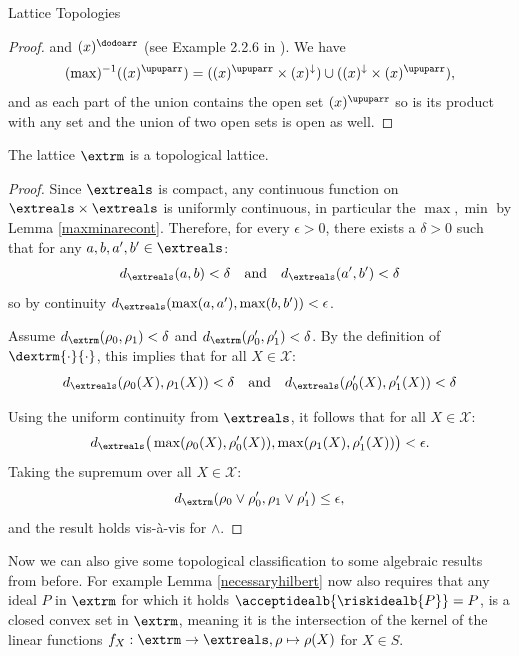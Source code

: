 \begin{subsection}{Lattice Topologies}
\begin{proof}
        and \( (x)^\dodoarr \) (see Example 2.2.6 in \cite{infinitedimanalysis}).
        We have \[ 
            (\max)^{-1} ((x)^\upuparr) = ((x)^\upuparr \times (x)^\downarrow) \cup ((x)^\downarrow \times (x)^\upuparr),
        \]
        and as each part of the union contains the open set \( (x)^\upuparr \) so is its product with any set
        and the union of two open sets is open as well.
    \end{proof}
    \begin{corollary}
        The lattice \( \extrm \) is a topological lattice.
    \end{corollary}
    \begin{proof}
        Since \( \extreals \) is compact, any continuous function on $\extreals \times \extreals$ is 
        uniformly continuous, in particular the \( \max, \min \) by Lemma \ref{maxminarecont}.
        Therefore, for every \(\epsilon > 0\), there exists a \(\delta > 0\) such that for any \(a, b, a', b' \in \extreals\):
        \[
        d_{\extreals}(a, b) < \delta \quad \text{and} \quad d_{\extreals}(a', b') < \delta 
        \]
        so by continuity \( d_{\extreals}(\max(a, a'), \max(b, b')) < \epsilon \).
        \newline

        Assume \(d_{\extrm}(\rho_{0}, \rho_{1}) < \delta\) and \(d_{\extrm}(\rho_0', \rho_1') < \delta\). 
        By the definition of \( \dextrm{\cdot}{\cdot} \), this implies that for all \(X \in \mathcal{X}\):
        \[
            d_{\extreals}(\rho_{0}(X), \rho_1(X)) < \delta \quad \text{and} \quad d_{\extreals}(\rho_0'(X), \rho_1'(X)) < \delta
        \]

        Using the uniform continuity from \( \extreals \), it follows that for all $X \in \mathcal{X}$:
        \[
            d_{\extreals}\big(\max(\rho_0(X), \rho_0'(X)), \max(\rho_1(X), \rho_1'(X))\big) < \epsilon.
        \]
        Taking the supremum over all \( X \in \mathcal{X}\):
        \[
            d_{\extrm}(\rho_0 \vee \rho_0', \rho_1 \vee \rho_1') \le \epsilon,
        \]
        and the result holds vis-à-vis for \( \wedge \).
    \end{proof}

   
    Now we can also give some topological classification to some algebraic results from before.
    For example Lemma \ref{necessaryhilbert} now also requires that any ideal \( P \)  
    in \( \extrm \) for which it holds \( \acceptidealb{\riskidealb{P}} = P \), is a closed convex set in \( \extrm \),
    meaning it is the intersection of the kernel of the linear functions \( f_X : \extrm \to \extreals, \rho \mapsto \rho(X) \)
    for \( X \in S \).
\end{subsection}
